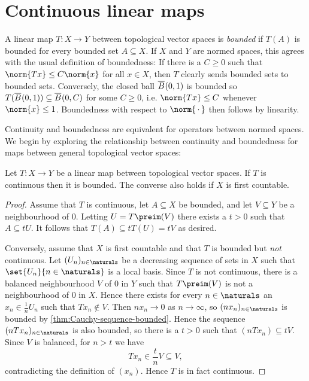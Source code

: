 \documentclass[article, a4paper, 11pt, oneside]{memoir}
\numberwithin{equation}{chapter}
\begin{document}
\section{Continuous linear maps}

A linear map $T \colon X \to Y$ between topological vector spaces is \emph{bounded} if $T(A)$ is bounded for every bounded set $A \subseteq X$. If $X$ and $Y$ are normed spaces, this agrees with the usual definition of boundedness: If there is a $C \geq 0$ such that $\norm{Tx} \leq C\norm{x}$ for all $x \in X$, then $T$ clearly sends bounded sets to bounded sets. Conversely, the closed ball $\overline{B}_{}(0,1)$ is bounded so $T(\overline{B}_{}(0,1)) \subseteq \overline{B}_{}(0,C)$ for some $C \geq 0$, i.e. $\norm{Tx} \leq C$ whenever $\norm{x} \leq 1$. Boundedness with respect to $\norm{\,\cdot\,}$ then follows by linearity.

Continuity and boundedness are equivalent for operators between normed spaces. We begin by exploring the relationship between continuity and boundedness for maps between general topological vector spaces:

\begin{proposition}
    \label{thm:continuity-boundedness-equivalent}
    Let $T \colon X \to Y$ be a linear map between topological vector spaces. If $T$ is continuous then it is bounded. The converse also holds if $X$ is first countable.
\end{proposition}

\begin{proof}
    Assume that $T$ is continuous, let $A \subseteq X$ be bounded, and let $V \subseteq Y$ be a neighbourhood of $0$. Letting $U = T\preim(V)$ there exists a $t > 0$ such that $A \subseteq tU$. It follows that $T(A) \subseteq tT(U) = tV$ as desired.

    Conversely, assume that $X$ is first countable and that $T$ is bounded but \emph{not} continuous. Let $(U_n)_{n \in \naturals}$ be a decreasing sequence of sets in $X$ such that $\set{U_n}{n \in \naturals}$ is a local basis. Since $T$ is not continuous, there is a balanced neighbourhood $V$ of $0$ in $Y$ such that $T\preim(V)$ is not a neighbourhood of $0$ in $X$. Hence there exists for every $n \in \naturals$ an $x_n \in \frac{1}{n} U_n$ such that $Tx_n \not\in V$. Then $nx_n \to 0$ as $n \to \infty$, so $(nx_n)_{n \in \naturals}$ is bounded by \cref{thm:Cauchy-sequence-bounded}. Hence the sequence $(nTx_n)_{n \in \naturals}$ is also bounded, so there is a $t > 0$ such that $(nTx_n) \subseteq tV$. Since $V$ is balanced, for $n > t$ we have
    \begin{equation*}
        Tx_n
            \in \frac{t}{n} V
            \subseteq V,
    \end{equation*}
    contradicting the definition of $(x_n)$. Hence $T$ is in fact continuous.
\end{proof}
\end{document}
